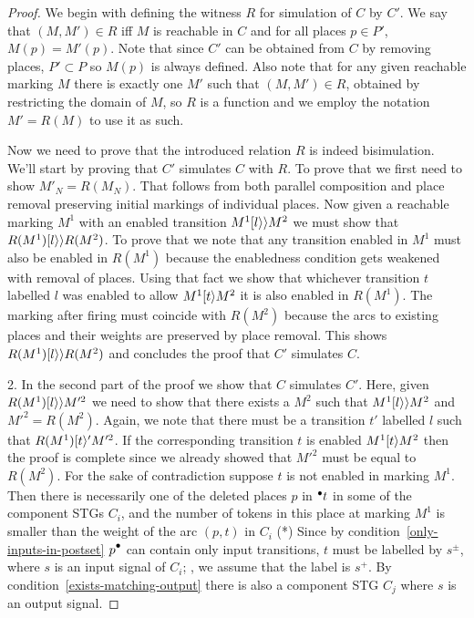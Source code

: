 \begin{proof}

We begin with defining the witness $R$ for simulation of $C$ by $C'$.
We say that $(M,M') \in R$ iff $M$ is reachable in $C$ and 
for all places $p \in P'$, $M(p)=M'(p)$.
Note that since $C'$ can be obtained from $C$ by removing places, $P' \subset P$ so $M(p)$ is always defined.
Also note that for any given reachable marking $M$ there is exactly one $M'$ such that $(M,M') \in R$, obtained by 
restricting the domain of $M$, so $R$ is a function and we employ the notation $M' = R(M)$ to use it as such.

Now we need to prove that the introduced relation $R$ is indeed bisimulation. 
We'll start by proving that $C'$ simulates $C$ with $R$.
To prove that we first need to show $M'_N = R(M_N)$. That follows from both parallel composition and place removal preserving initial markings of individual places.
Now given a reachable marking $M^1$ with an enabled transition $M^1 [l\rangle\rangle M^2$ we must show that $R(M^1) [l\rangle\rangle R(M^2)$. To prove that we note that any transition enabled in $M^1$ must also be enabled in $R(M^1)$ because the enabledness condition gets weakened with removal of places. Using that fact we show that whichever transition $t$ labelled $l$ was enabled to allow $M^1 [t\rangle M^2$ it is also enabled in $R(M^1)$. The marking after firing must coincide with $R(M^2)$ because the arcs to existing places and their weights are preserved by place removal. This shows $R(M^1) [l\rangle\rangle R(M^2)$ and concludes the proof that $C'$ simulates $C$.

2. In the second part of the proof we show that $C$ simulates $C'$. Here, given $R(M^1) [l\rangle\rangle M'^2$ we need to show that there exists a $M^2$ such that $M^1 [l\rangle\rangle M^2$ and $M'^2 = R(M^2)$. Again, we note that there must be a transition $t'$ labelled $l$ such that $R(M^1) [t\rangle' M'^2$. If the corresponding transition $t$ is enabled $M^1 [t\rangle M^2$ then the proof is complete since we already showed that $M'^2$ must be equal to $R(M^2)$. For the sake of contradiction suppose $t$ is not enabled in marking $M^1$. Then there is necessarily one of the deleted places $p$ in ${}^\bullet {t}$ in some of the component STGs $C_i$, and the number of tokens in this place at marking $M^1$ is
smaller than the weight of the arc $(p,t)$ in $C_i$ (*)
Since by condition~\ref{only-inputs-in-postset} $\post{p}$ can
contain only input transitions, $t$ must be labelled by
$s^\pm$, where $s$ is an input signal of $C_i$; \wlogg, we
assume that the label is $s^+$. By
condition~\ref{exists-matching-output} there is also a
component STG $C_j$ where $s$ is an output signal.


\end{proof}
